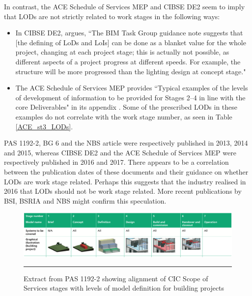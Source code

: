 In contrast, the ACE Schedule of Services MEP and CIBSE DE2 seem to imply that LODs are not strictly related to work stages in the following ways:
\begin{itemize}
	\item In CIBSE DE2, \cite{DE2} argues, ``The BIM Task Group guidance note suggests that [the defining of LoDs and LoIs] can be done as a blanket value for the whole project, changing at each project stage; this is actually not possible, as different aspects of a project progress at different speeds. For example, the structure will be more progressed than the lighting design at concept stage."
		
	\item The ACE Schedule of Services MEP provides ``Typical examples of the levels of development of information to be provided for Stages 2–4 in line with the core Deliverables" in its appendix \citep{ACE2017}.
	Some of the prescribed LODs in these examples do not correlate with the work stage number, as seen in Table \ref{ACE_st3_LODs}.
\end{itemize}

PAS 1192-2, BG 6 and the NBS article were respectively published in 2013, 2014 and 2015, whereas CIBSE DE2 and the ACE Schedule of Services MEP were respectively published in 2016 and 2017.
There appears to be a correlation between the publication dates of these documents and their guidance on whether LODs are work stage related.
Perhaps this suggests that the industry realised in 2016 that LODs should not be work stage related.
More recent publications by BSI, BSRIA and NBS might confirm this speculation.


\begin{figure}[htbp]
	\centering
	\includegraphics[width=\textwidth]{figures/PAS_RIBAPoW_alignment.png}
	\rule{\textwidth}{0.5pt} %
	\caption[Alignment of work stages with PAS 1192-2 LODs.]{Extract from PAS 1192-2 showing alignment of CIC Scope of Services stages with levels of model definition for building projects \citep[Figure~20]{PAS1192}}
	\label{PAS_RIBAPoW_alignment}
\end{figure}


